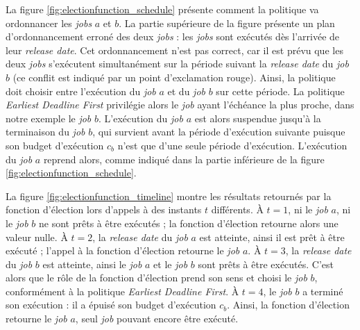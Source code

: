 			\begin{figure}[!ht]
			\end{figure}

			La figure \ref{fig:electionfunction_schedule} présente comment la politique va ordonnancer les \emph{jobs} $a$ et $b$. La partie supérieure de la figure présente un plan d'ordonnancement erroné des deux \emph{jobs} : les \emph{jobs} sont exécutés dès l'arrivée de leur \emph{release date}. Cet ordonnancement n'est pas correct, car il est prévu que les deux \emph{jobs} s'exécutent simultanément sur la période suivant la \emph{release date} du \emph{job} $b$ (ce conflit est indiqué par un point d'exclamation rouge). Ainsi, la politique doit choisir entre l'exécution du \emph{job} $a$ et du \emph{job} $b$ sur cette période. La politique \emph{Earliest Deadline First} privilégie alors le \emph{job} ayant l'échéance la plus proche, dans notre exemple le \emph{job} $b$. L'exécution du \emph{job} $a$ est alors suspendue jusqu'à la terminaison du \emph{job} $b$, qui survient avant la période d'exécution suivante puisque son budget d'exécution $c_b$ n'est que d'une seule période d'exécution. L'exécution du \emph{job} $a$ reprend alors, comme indiqué dans la partie inférieure de la figure \ref{fig:electionfunction_schedule}.

			La figure \ref{fig:electionfunction_timeline} montre les résultats retournés par la fonction d'élection lors d'appels à des instants $t$ différents. À $t = 1$, ni le \emph{job} $a$, ni le \emph{job} $b$ ne sont prêts à être exécutés ; la fonction d'élection retourne alors une valeur nulle. À $t = 2$, la \emph{release date} du \emph{job} $a$ est atteinte, ainsi il est prêt à être exécuté ; l'appel à la fonction d'élection retourne le \emph{job} $a$. À $t = 3$, la \emph{release date} du \emph{job} $b$ est atteinte, ainsi le \emph{job} $a$ et le \emph{job} $b$ sont prêts à être exécutés. C'est alors que le rôle de la fonction d'élection prend son sens et choisi le \emph{job} $b$, conformément à la politique \emph{Earliest Deadline First}. À $t = 4$, le \emph{job} $b$ a terminé son exécution : il a épuisé son budget d'exécution $c_b$. Ainsi, la fonction d'élection retourne le \emph{job} $a$, seul \emph{job} pouvant encore être exécuté.

			\begin{figure}[!ht]
			\end{figure}

